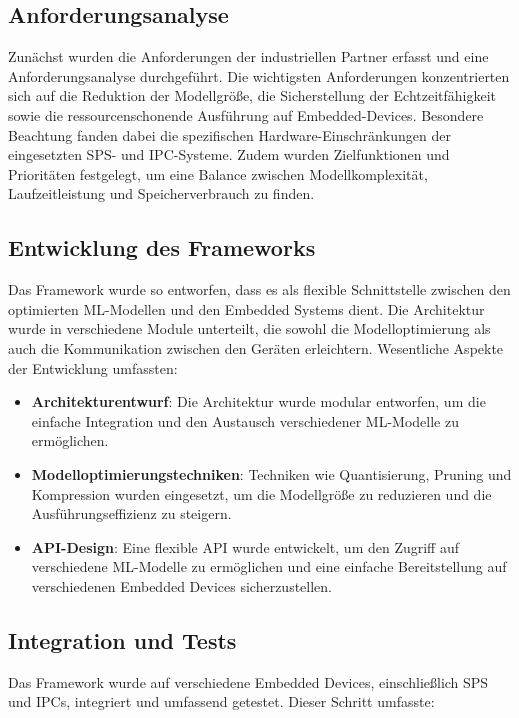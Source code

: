 \subsection{Anforderungsanalyse}
Zunächst wurden die Anforderungen der industriellen Partner erfasst und eine Anforderungsanalyse durchgeführt. Die wichtigsten Anforderungen konzentrierten sich auf 
die Reduktion der Modellgröße, die Sicherstellung der Echtzeitfähigkeit sowie die ressourcenschonende Ausführung auf Embedded-Devices. Besondere Beachtung fanden 
dabei die spezifischen Hardware-Einschränkungen der eingesetzten SPS- und IPC-Systeme. Zudem wurden Zielfunktionen und Prioritäten festgelegt, um eine Balance 
zwischen Modellkomplexität, Laufzeitleistung und Speicherverbrauch zu finden.

\subsection{Entwicklung des Frameworks}
Das Framework wurde so entworfen, dass es als flexible Schnittstelle zwischen den optimierten ML-Modellen und den Embedded Systems dient. Die Architektur wurde 
in verschiedene Module unterteilt, die sowohl die Modelloptimierung als auch die Kommunikation zwischen den Geräten erleichtern. Wesentliche Aspekte der 
Entwicklung umfassten:

\begin{itemize}
    \item \textbf{Architekturentwurf}: Die Architektur wurde modular entworfen, um die einfache Integration und den Austausch verschiedener ML-Modelle zu ermöglichen.
    \item \textbf{Modelloptimierungstechniken}: Techniken wie Quantisierung, Pruning und Kompression wurden eingesetzt, um die Modellgröße zu reduzieren und die 
    Ausführungseffizienz zu steigern.
    \item \textbf{API-Design}: Eine flexible API wurde entwickelt, um den Zugriff auf verschiedene ML-Modelle zu ermöglichen und eine einfache 
    Bereitstellung auf verschiedenen Embedded Devices sicherzustellen.
\end{itemize}

\subsection{Integration und Tests}
Das Framework wurde auf verschiedene Embedded Devices, einschließlich SPS und IPCs, integriert und umfassend getestet. Dieser Schritt umfasste:

